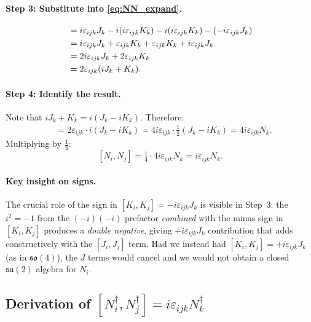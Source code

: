 \paragraph{Step 3: Substitute into \eqref{eq:NN_expand}.}
\begin{align}
  [J_i - iK_i,\; J_j - iK_j]
  &= i\varepsilon_{ijk}J_k
     - i(i\varepsilon_{ijk}K_k)
     - i(i\varepsilon_{ijk}K_k)
     - (-i\varepsilon_{ijk}J_k)
  \notag\\
  &= i\varepsilon_{ijk}J_k
     + \varepsilon_{ijk}K_k
     + \varepsilon_{ijk}K_k
     + i\varepsilon_{ijk}J_k
  \notag\\
  &= 2i\varepsilon_{ijk}J_k + 2\varepsilon_{ijk}K_k
  \notag\\
  &= 2\varepsilon_{ijk}(iJ_k + K_k).
  \label{eq:step3}
\end{align}

\paragraph{Step 4: Identify the result.}
Note that $iJ_k + K_k = i(J_k - iK_k)$. Therefore:
\begin{align}
  [J_i - iK_i,\; J_j - iK_j]
  &= 2\varepsilon_{ijk}\cdot i(J_k - iK_k)
   = 4i\varepsilon_{ijk}\cdot\tfrac{1}{2}(J_k - iK_k)
   = 4i\varepsilon_{ijk}N_k.
\end{align}
Multiplying by $\tfrac{1}{4}$:
\begin{equation}
  \boxed{[N_i, N_j] = \tfrac{1}{4}\cdot 4i\varepsilon_{ijk}N_k = i\varepsilon_{ijk}N_k.}
\end{equation}

\paragraph{Key insight on signs.}
The crucial role of the sign in $[K_i,K_j]=-i\varepsilon_{ijk}J_k$ is
visible in Step~3: the $i^2 = -1$ from the $(-i)(-i)$ prefactor
\emph{combined} with the minus sign in $[K_i,K_j]$
produces a \emph{double negative}, giving $+i\varepsilon_{ijk}J_k$
contribution that adds constructively with the $[J_i,J_j]$ term.
Had we instead had $[K_i,K_j]=+i\varepsilon_{ijk}J_k$
(as in $\mathfrak{so}(4)$), the $J$ terms would cancel and we would not
obtain a closed $\mathfrak{su}(2)$ algebra for $N_i$.

\subsection{Derivation of
  \texorpdfstring{$[N_i^\dagger,N_j^\dagger]=i\varepsilon_{ijk}N_k^\dagger$}%
    {[N†,N†]=iepsN†}}

